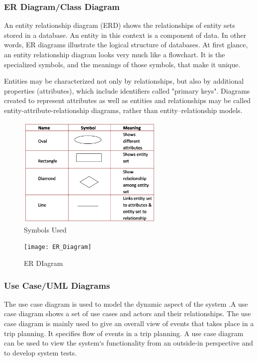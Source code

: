 \subsubsection{ER Diagram/Class Diagram}

         An entity relationship diagram (ERD) shows the relationships of entity sets stored in a database. An entity in this context is a component of data. In other words, ER diagrams illustrate the logical structure of databases. At first glance, an entity relationship diagram looks very much like a flowchart. It is the specialized symbols, and the meanings of those symbols, that make it unique. 

Entities may be characterized not only by relationships, but also by additional properties (attributes), which include identifiers called "primary keys". Diagrams created to represent attributes as well as entities and relationships may be called entity-attribute-relationship diagrams, rather than entity–relationship models.

\begin{figure}[!h]
	\begin{center}
		\includegraphics[width=7cm]{ER_Symbol}
	\end{center}
\caption{Symbols Used}
\end{figure}

\begin{figure}[!h]
	\begin{center}
		\texttt{[image: ER\_Diagram]}
	\end{center}
\caption{ER DIagram}
\end{figure}

%
\subsubsection{Use Case/UML Diagrams}

The use case diagram is used to model the dynamic aspect of the system .A use case diagram shows a set of use cases and actors and their relationships. The use case diagram is mainly used to give an overall view of events that takes place in a trip planning. It specifies flow of events in a trip planning. A use case diagram can be used to view the system‘s functionality from an outside-in perspective and to develop system tests. 

